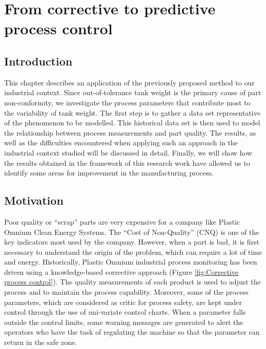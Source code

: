 \chapter{From corrective to predictive process control} \label{From Corrective to Predictive Process Control}
\minitoc

\section{Introduction}

This chapter describes an application of the previously proposed method to our industrial context. Since out-of-tolerance tank weight is the primary cause of part non-conformity, we investigate the process parameters that contribute most to the variability of tank weight. The first step is to gather a data set representative of the phenomenon to be modelled.  This historical data set is then used to model the relationship between process measurements and part quality. The results, as well as the difficulties encountered when applying such an approach in the industrial context studied will be discussed in detail. Finally, we will show how the results obtained in the framework of this research work have allowed us to identify some areas for improvement in the manufacturing process. 


\section{Motivation}

Poor quality or ``scrap'' parts are very expensive for a company like Plastic Omnium Clean Energy Systems. The “Cost of Non-Quality” (CNQ) is one of the key indicators most used by the company. However, when a part is bad, it is first necessary to understand the origin of the problem, which can require a lot of time and energy. Historically, Plastic Omnium industrial process monitoring has been driven using a knowledge-based corrective approach (Figure \ref{fig:Corrective process control}). The quality measurements of each product is used to adjust the process and to maintain the process capability. Moreover, some of the process parameters, which are considered as critic for process safety, are kept under control through the use of uni-variate control charts.  When a parameter falls outside the control limits, some warning messages are generated to alert the operators who have the task of regulating the machine so that the parameter can return in the safe zone. 

